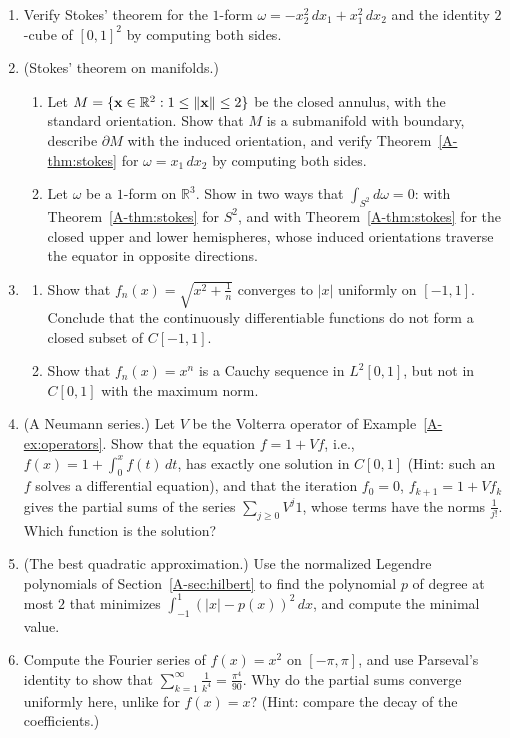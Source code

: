 \begin{enumerate}[leftmargin=*]
\begin{enumerate}[label=(\alph*)]
    \end{enumerate}
    \item Verify Stokes' theorem for the $1$-form $\omega = -x_2^2\, dx_1 + x_1^2\, dx_2$ and the identity $2$-cube of $[0, 1]^2$ by computing both sides.
    \item (Stokes' theorem on manifolds.)
    \begin{enumerate}[label=(\alph*)]
        \item Let $M = \{\mathbf{x} \in \mathbb{R}^2 : 1 \leq \lVert \mathbf{x} \rVert \leq 2\}$ be the closed annulus, with the standard orientation. Show that $M$ is a submanifold with boundary, describe $\partial M$ with the induced orientation, and verify Theorem~\ref{A-thm:stokes} for $\omega = x_1\, dx_2$ by computing both sides.
        \item Let $\omega$ be a $1$-form on $\mathbb{R}^3$. Show in two ways that $\int_{S^2} d\omega = 0$: with Theorem~\ref{A-thm:stokes} for $S^2$, and with Theorem~\ref{A-thm:stokes} for the closed upper and lower hemispheres, whose induced orientations traverse the equator in opposite directions.
    \end{enumerate}
    \item \begin{enumerate}[label=(\alph*)]
        \item Show that $f_n(x) = \sqrt{x^2 + \frac{1}{n}}$ converges to $|x|$ uniformly on $[-1, 1]$. Conclude that the continuously differentiable functions do not form a closed subset of $C[-1, 1]$.
        \item Show that $f_n(x) = x^n$ is a Cauchy sequence in $L^2[0, 1]$, but not in $C[0, 1]$ with the maximum norm.
    \end{enumerate}
    \item (A Neumann series.) Let $V$ be the Volterra operator of Example~\ref{A-ex:operators}. Show that the equation $f = 1 + Vf$, i.e., $f(x) = 1 + \int_0^x f(t)\, dt$, has exactly one solution in $C[0, 1]$ (Hint: such an $f$ solves a differential equation), and that the iteration $f_0 = 0$, $f_{k+1} = 1 + Vf_k$ gives the partial sums of the series $\sum_{j \geq 0} V^j1$, whose terms have the norms $\frac{1}{j!}$. Which function is the solution?
    \item (The best quadratic approximation.) Use the normalized Legendre polynomials of Section~\ref{A-sec:hilbert} to find the polynomial $p$ of degree at most $2$ that minimizes $\int_{-1}^1 (|x| - p(x))^2\, dx$, and compute the minimal value.
    \item Compute the Fourier series of $f(x) = x^2$ on $[-\pi, \pi]$, and use Parseval's identity to show that $\sum_{k=1}^\infty \frac{1}{k^4} = \frac{\pi^4}{90}$. Why do the partial sums converge uniformly here, unlike for $f(x) = x$? (Hint: compare the decay of the coefficients.)

\end{enumerate}
